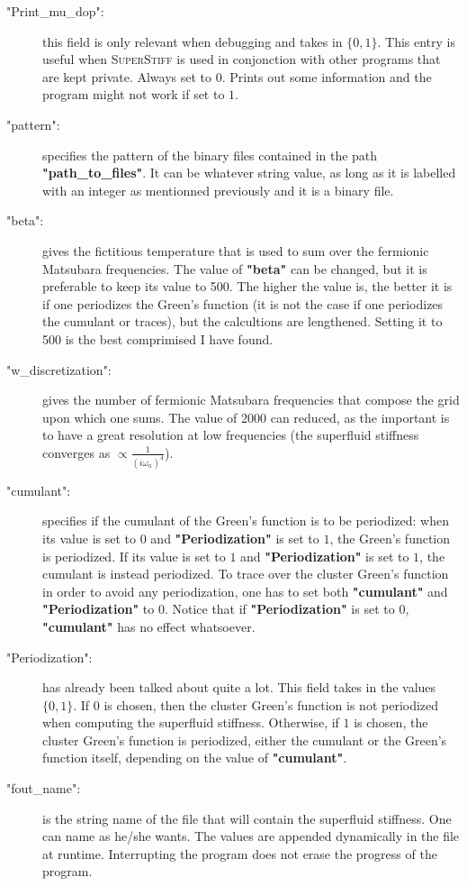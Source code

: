 \documentclass{article}
\begin{document}
\begin{description}
%
\item["Print\_mu\_dop":] this field is only relevant when debugging and takes in $\{0,1\}$. This entry is useful when \textsc{SuperStiff} is used in conjonction with other programs that are kept private. Always set to $0$. Prints out some information and the program might not work if set to $1$.
%
\item["pattern":] specifies the pattern of the binary files contained in the path \textbf{"path\_to\_files"}. It can be whatever string value, as long as it is labelled with an integer as mentionned previously and it is a binary file.
%
\item["beta":] gives the fictitious temperature that is used to sum over the fermionic Matsubara frequencies. The value of \textbf{"beta"} can be changed, but it is preferable to keep its value to 500. The higher the value is, the better it is if one periodizes the Green's function (it is not the case if one periodizes the cumulant or traces), but the calcultions are lengthened. Setting it to 500 is the best comprimised I have found.
%
\item["w\_discretization":] gives the number of fermionic Matsubara frequencies that compose the grid upon which one sums. The value of 2000 can reduced, as the important is to have a great resolution at low frequencies (the superfluid stiffness converges as $\propto \frac{1}{(i\omega_n)^4}$).
%
\item["cumulant":] specifies if the cumulant of the Green's function is to be periodized: when its value is set to $0$ and \textbf{"Periodization"} is set to $1$, the Green's function is periodized. If its value is set to $1$ and \textbf{"Periodization"} is set to $1$, the cumulant is instead periodized. To trace over the cluster Green's function in order to avoid any periodization, one has to set both \textbf{"cumulant"} and \textbf{"Periodization"} to $0$. Notice that if \textbf{"Periodization"} is set to $0$, \textbf{"cumulant"} has no effect whatsoever.
%
\item["Periodization":] has already been talked about quite a lot. This field takes in the values $\{0,1\}$. If $0$ is chosen, then the cluster Green's function is not periodized when computing the superfluid stiffness. Otherwise, if $1$ is chosen, the cluster Green's function is periodized, either the cumulant or the Green's function itself, depending on the value of \textbf{"cumulant"}.
%
\item["fout\_name":] is the string name of the file that will contain the superfluid stiffness. One can name as he/she wants. The values are appended dynamically in the file at runtime. Interrupting the program does not erase the progress of the program.
\end{description}
\end{document}
